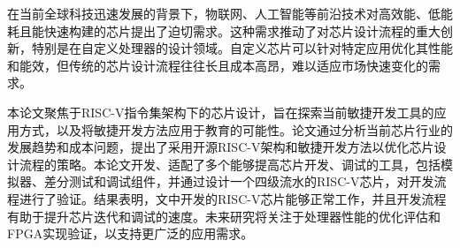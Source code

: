 在当前全球科技迅速发展的背景下，物联网、人工智能等前沿技术对高效能、低能耗且能快速构建的芯片提出了迫切需求。这种需求推动了对芯片设计流程的重大创新，特别是在自定义处理器的设计领域。自定义芯片可以针对特定应用优化其性能和能效，但传统的芯片设计流程往往长且成本高昂，难以适应市场快速变化的需求。

本论文聚焦于RISC-V指令集架构下的芯片设计，旨在探索当前敏捷开发工具的应用方式，以及将敏捷开发方法应用于教育的可能性。论文通过分析当前芯片行业的发展趋势和成本问题，提出了采用开源RISC-V架构和敏捷开发方法以优化芯片设计流程的策略。本论文开发、适配了多个能够提高芯片开发、调试的工具，包括模拟器、差分测试和调试组件，并通过设计一个四级流水的RISC-V芯片，对开发流程进行了验证。结果表明，文中开发的RISC-V芯片能够正常工作，并且开发流程有助于提升芯片迭代和调试的速度。未来研究将关注于处理器性能的优化评估和FPGA实现验证，以支持更广泛的应用需求。
